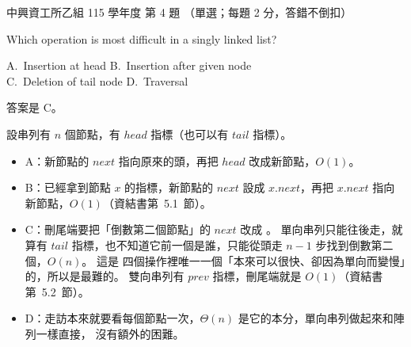 \begin{pastexam}[label={px:nchu-115-is-04}]{中興資工所乙組 115 學年度 第 4 題}
（單選；每題 2 分，答錯不倒扣）

Which operation is most difficult in a singly linked list?

A.~Insertion at head \qquad B.~Insertion after given node\\
C.~Deletion of tail node \qquad D.~Traversal
\end{pastexam}

\begin{pastsoln}
答案是 C。

設串列有 $n$ 個節點，有 $\mathit{head}$ 指標（也可以有 $\mathit{tail}$ 指標）。
\begin{itemize}
\item A：新節點的 $\mathit{next}$ 指向原來的頭，再把 $\mathit{head}$ 改成新節點，$O(1)$。
\item B：已經拿到節點 $x$ 的指標，新節點的 $\mathit{next}$ 設成 $x.\mathit{next}$，再把
$x.\mathit{next}$ 指向新節點，$O(1)$（資結書第~5.1~節）。
\item C：刪尾端要把「倒數第二個節點」的 $\mathit{next}$ 改成 \NIL。 單向串列只能往後走，就算有
$\mathit{tail}$ 指標，也不知道它前一個是誰，只能從頭走 $n - 1$ 步找到倒數第二個，$O(n)$。 這是
四個操作裡唯一一個「本來可以很快、卻因為單向而變慢」的，所以是最難的。 雙向串列有
$\mathit{prev}$ 指標，刪尾端就是 $O(1)$（資結書第~5.2~節）。
\item D：走訪本來就要看每個節點一次，$\Theta(n)$ 是它的本分，單向串列做起來和陣列一樣直接，
沒有額外的困難。
\end{itemize}
\end{pastsoln}

